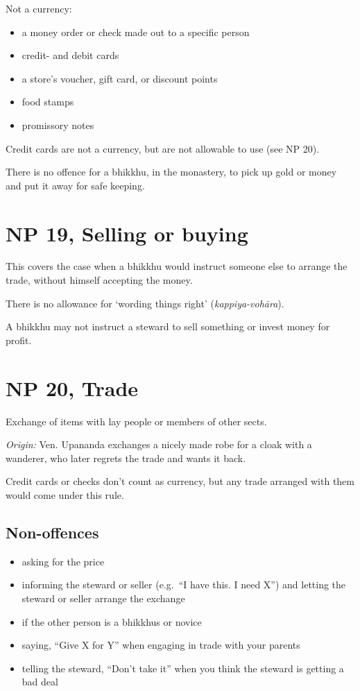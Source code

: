 Not a currency:

\begin{itemize}
\tightlist
\item
  a money order or check made out to a specific person
\item
  credit- and debit cards
\item
  a store's voucher, gift card, or discount points
\item
  food stamps
\item
  promissory notes
\end{itemize}

Credit cards are not a currency, but are not allowable to use (see NP
20).

There is no offence for a bhikkhu, in the monastery, to pick up gold or
money and put it away for safe keeping.

\section{NP 19, Selling or buying}

This covers the case when a bhikkhu would instruct someone else to
arrange the trade, without himself accepting the money.

There is no allowance for `wording things right'
(\emph{kappiya-vohāra}).

A bhikkhu may not instruct a steward to sell something or invest money
for profit.

\section{NP 20, Trade}

Exchange of items with lay people or members of other sects.

\emph{Origin:} Ven. Upananda exchanges a nicely made robe for a cloak
with a wanderer, who later regrets the trade and wants it back.

Credit cards or checks don't count as currency, but any trade arranged
with them would come under this rule.

\subsection{Non-offences}

\begin{itemize}
\tightlist
\item
  asking for the price
\item
  informing the steward or seller (e.g.~``I have this. I need X'') and
  letting the steward or seller arrange the exchange
\item
  if the other person is a bhikkhus or novice
\item
  saying, ``Give X for Y'' when engaging in trade with your parents
\item
  telling the steward, ``Don't take it'' when you think the steward is
  getting a bad deal
\end{itemize}

